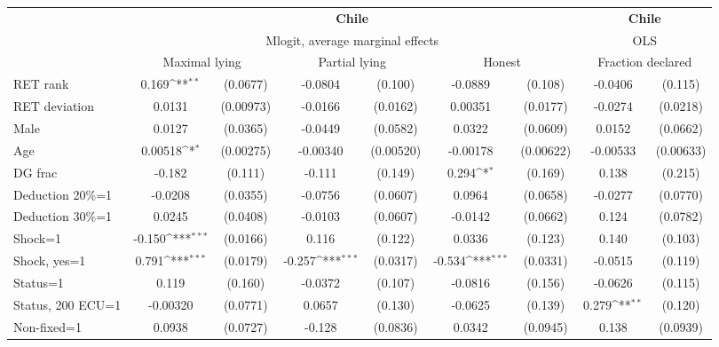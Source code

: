 \def\sym#1{\ifmmode^{#1}\else\(^{#1}\)\fi}
\begin{tabular}{l|cccccc|cc}
\hline\hline
&\multicolumn{6}{c|}{\bf Chile}&\multicolumn{2}{c}{\bf Chile}\\ &\multicolumn{6}{c|}{Mlogit, average marginal effects }&\multicolumn{2}{c}{OLS}\\
                &\multicolumn{2}{c}{Maximal lying}&\multicolumn{2}{c}{Partial lying}&\multicolumn{2}{c}{Honest}  &\multicolumn{2}{c}{Fraction declared}\\
\hline
RET rank        &    0.169\sym{**} & (0.0677)&  -0.0804         &  (0.100)&  -0.0889         &  (0.108)&  -0.0406         &  (0.115)\\
RET deviation   &   0.0131         &(0.00973)&  -0.0166         & (0.0162)&  0.00351         & (0.0177)&  -0.0274         & (0.0218)\\
Male            &   0.0127         & (0.0365)&  -0.0449         & (0.0582)&   0.0322         & (0.0609)&   0.0152         & (0.0662)\\
Age             &  0.00518\sym{*}  &(0.00275)& -0.00340         &(0.00520)& -0.00178         &(0.00622)& -0.00533         &(0.00633)\\
DG frac         &   -0.182         &  (0.111)&   -0.111         &  (0.149)&    0.294\sym{*}  &  (0.169)&    0.138         &  (0.215)\\
Deduction 20\%=1&  -0.0208         & (0.0355)&  -0.0756         & (0.0607)&   0.0964         & (0.0658)&  -0.0277         & (0.0770)\\
Deduction 30\%=1&   0.0245         & (0.0408)&  -0.0103         & (0.0607)&  -0.0142         & (0.0662)&    0.124         & (0.0782)\\
Shock=1         &   -0.150\sym{***}& (0.0166)&    0.116         &  (0.122)&   0.0336         &  (0.123)&    0.140         &  (0.103)\\
Shock, yes=1    &    0.791\sym{***}& (0.0179)&   -0.257\sym{***}& (0.0317)&   -0.534\sym{***}& (0.0331)&  -0.0515         &  (0.119)\\
Status=1        &    0.119         &  (0.160)&  -0.0372         &  (0.107)&  -0.0816         &  (0.156)&  -0.0626         &  (0.115)\\
Status, 200 ECU=1& -0.00320         & (0.0771)&   0.0657         &  (0.130)&  -0.0625         &  (0.139)&    0.279\sym{**} &  (0.120)\\
Non-fixed=1     &   0.0938         & (0.0727)&   -0.128         & (0.0836)&   0.0342         & (0.0945)&    0.138         & (0.0939)\\

\end{tabular}
